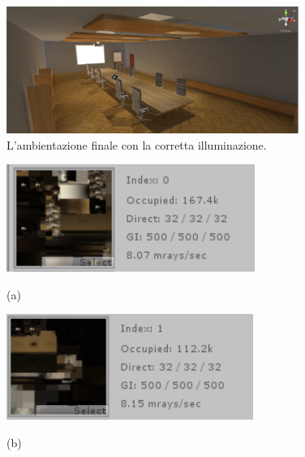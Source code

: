 \begin{figure}[H]
	\includegraphics[width=0.85\textwidth]{figure/Lighted}
	\centering
	\vspace{0.3cm}
	\caption{L'ambientazione finale con la corretta illuminazione.}
\end{figure}
\begin{figure}[H]
	\centering
	\begin{minipage}[b]{0.49\textwidth}
		\includegraphics[width=\textwidth]{figure/Lightmap1}
		{\footnotesize \centerline{(a)} \par}
	\end{minipage}
	\hfill
	\begin{minipage}[b]{0.49\textwidth}
		\includegraphics[width=\textwidth]{figure/Lightmap2}
		{\footnotesize \centerline{(b)} \par}
	\end{minipage}
	\begin{minipage}[b]{0.49\textwidth}

\end{minipage}
\end{figure}
